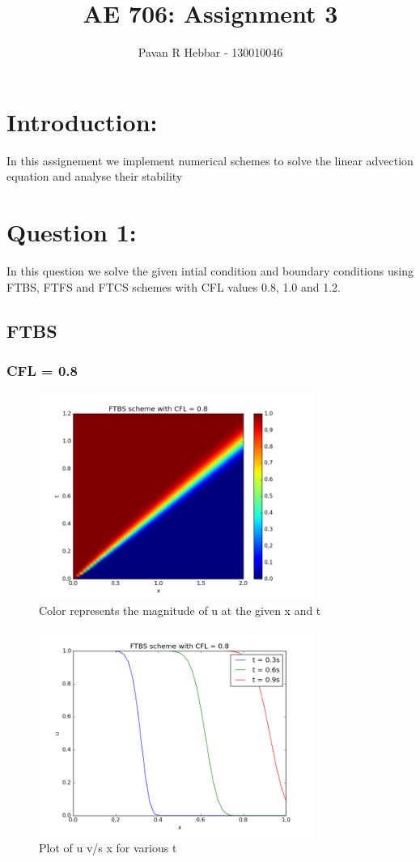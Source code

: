 \documentclass[11pt, a4paper]{article}
\title{\textbf{AE 706: Assignment 3}}
\author{Pavan R Hebbar - 130010046}
\begin{document}
\maketitle
\newpage
\tableofcontents
\newpage
\section{Introduction:}
In this assignement we implement numerical schemes to solve the linear advection equation and analyse their stability

\section{Question 1:}
In this question we solve the given intial condition and boundary conditions using FTBS, FTFS and FTCS schemes with CFL values
0.8, 1.0 and 1.2.

\subsection{FTBS}
\subsubsection{CFL = 0.8}
\begin{figure}[H]
 \centering
 \includegraphics[width = 0.8\textwidth]{FTBS1_08.png}
 \caption{Color represents the magnitude of u at the given x and t}
\end{figure}

\begin{figure}[H]
 \centering
 \includegraphics[width = 0.8\textwidth]{FTBS1_08_1.png}
 \caption{Plot of u v/s x for various t}
\end{figure}
\end{document}
